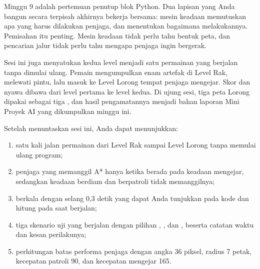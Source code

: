 

Minggu 9 adalah pertemuan penutup blok Python. Dua lapisan yang Anda bangun
secara terpisah akhirnya bekerja bersama: mesin keadaan memutuskan apa yang
harus dilakukan penjaga, dan  menentukan bagaimana
melakukannya. Pemisahan itu penting. Mesin keadaan tidak perlu tahu bentuk
peta, dan pencarian jalur tidak perlu tahu mengapa penjaga ingin bergerak.

Sesi ini juga menyatukan kedua level menjadi satu permainan yang berjalan
tanpa dimulai ulang. Pemain mengumpulkan enam artefak di Level Rak, melewati
pintu, lalu masuk ke Level Lorong tempat penjaga mengejar. Skor dan nyawa
dibawa dari level pertama ke level kedua. Di ujung sesi, tiga peta Lorong
dipakai sebagai tiga , dan hasil pengamatannya menjadi
bahan laporan  Mini Proyek AI yang dikumpulkan minggu ini.


\begin{tujuanbox}
Setelah menuntaskan sesi ini, Anda dapat menunjukkan:
\begin{enumerate}[leftmargin=1.5em, itemsep=0.2em]
  \item satu kali jalan permainan dari Level Rak sampai Level Lorong tanpa
        memulai ulang program;
  \item penjaga yang memanggil A* hanya ketika berada pada keadaan mengejar,
        sedangkan keadaan berdiam dan berpatroli tidak memanggilnya;
  \item {} berkala dengan selang 0,3 detik yang dapat Anda
        tunjukkan pada kode dan hitung pada saat berjalan;
  \item tiga skenario uji yang berjalan dengan pilihan ,
        , dan , beserta catatan waktu dan kesan perilakunya;
  \item perhitungan batas performa penjaga dengan angka 36 piksel, radius
        7 petak, kecepatan patroli 90, dan kecepatan mengejar 165.
\end{enumerate}
\end{tujuanbox}

